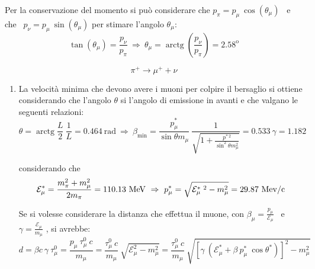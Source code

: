 \documentclass[12pt,twoside,a4]{article}
\DeclareMathOperator{\arctg}{arctg}
\begin{document}
\begin{solution}
\begin{enumerate}[label=(\textit{\roman*})]
Per la conservazione del momento si può considerare che $p_\pi = p_\mu \ \cos{(\theta_\mu)}$ \ e che \ $ p_\nu = p_\mu \ \sin{(\theta_\mu)}$ per stimare l'angolo $\theta_\mu$: 
\begin{equation*}
    \tan{(\theta_\mu)} = \frac{p_\nu}{p_\pi}  \  \Rightarrow  \  \theta_\mu = \arctg{\left( \frac{p_\nu}{p_\pi}\right)} = 2.58^{\mathrm{o}} 
\end{equation*}
\end{enumerate}
\end{solution}





\begin{solution}
\begin{equation}\label{eq: dec5.6}
    \pi^+ \rightarrow \mu^+ + \nu 
\end{equation}

\begin{enumerate}[label=(\textit{\roman*})]
	\item La velocità minima che devono avere i muoni per colpire il bersaglio si ottiene considerando che l'angolo $\theta$ si l'angolo di emissione in avanti e che valgano le seguenti relazioni: \begin{equation*}
 \theta = \arctg{\frac{L}{2} \ \frac{1}{L}} = 0.464 \ \mathrm{rad}  \  \Rightarrow  \  \beta_{\mathrm{min}} = \frac{p^\ast_\mu}{\sin{\theta} m_\mu} \ \frac{1}{\sqrt{1 + \frac{p^{\ast \ 2}}{\sin^2{\theta} m^2_\mu}}} = 0.533  \  \gamma = 1.182   
\end{equation*} 

considerando che \begin{equation*}
\mathcal{E}^\ast_\mu = \frac{m^2_\pi + m^2_\mu}{2 m_\pi} = 110.13 \ \mev     \  \Rightarrow  \  p^\ast_\mu = \sqrt{\mathcal{E}^{\ast \ 2 }_\mu - m^2_\mu} =  29.87 \ \mathrm{Mev/c}  
\end{equation*}

\bigskip
Se si volesse considerare la distanza che effettua il muone, con $\beta_\mu = \frac{p_\mu}{\mathcal{E}_\mu}$ \ e \ $\gamma = \frac{\mathcal{E}_\mu}{m_\mu}$ , si avrebbe: \begin{equation*}
d = \beta c \ \gamma \ \tau^0_\mu  = \frac{p_\mu \ \tau^0_\mu \ c}{m_\mu}  = \frac{ \tau^0_\mu \ c}{m_\mu} \ \sqrt{\mathcal{E}^{2}_\mu - m^2_\mu} = \frac{ \tau^0_\mu \ c}{m_\mu} \ \sqrt{[\gamma \ (\mathcal{E}^\ast_\mu + \beta \ p^\ast_\mu \ \cos{\theta^\ast})]^{2} - m^2_\mu}  
\end{equation*}


\end{enumerate}
\end{solution}
\end{document}
